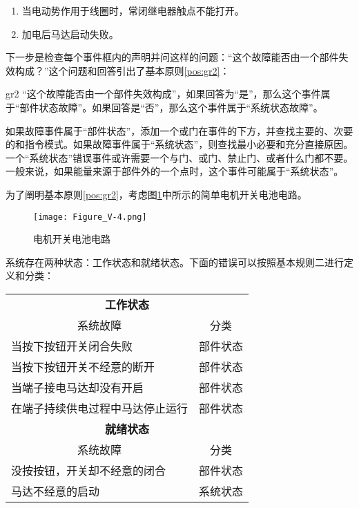 \documentclass[cn,11pt,chinese]{elegantbook}
\begin{document}
\begin{enumerate}
	\item 当电动势作用于线圈时，常闭继电器触点不能打开。
	\item 加电后马达启动失败。
\end{enumerate}


下一步是检查每个事件框内的声明并问这样的问题：“这个故障能否由一个部件失效构成？”这个问题和回答引出了基本原则\ref{pos:gr2}：

\begin{postulate}{}{gr2}
	“这个故障能否由一个部件失效构成”，如果回答为“是”，那么这个事件属于“部件状态故障”。如果回答是“否”，那么这个事件属于“系统状态故障”。
\end{postulate}

如果故障事件属于“部件状态”，添加一个或门在事件的下方，并查找主要的、次要的和指令模式。如果故障事件属于“系统状态”，则查找最小必要和充分直接原因。一个“系统状态”错误事件或许需要一个与门、或门、禁止门、或者什么门都不要。一般来说，如果能量来源于部件外的一个点时，这个事件可能属于“系统状态”。

为了阐明基本原则\ref{pos:gr2}，考虑图\ref{fig:fig5_4}中所示的简单电机开关电池电路。

\begin{figure}[h]
	\centering
	\texttt{[image: Figure\_V-4.png]}
	\caption{电机开关电池电路}\label{fig:fig5_4}
\end{figure}

系统存在两种状态：工作状态和就绪状态。下面的错误可以按照基本规则二进行定义和分类：


\begin{table}[H]
	\centering
	\begin{tabular}{@{}ll@{}}
		\multicolumn{2}{c}{\textbf{工作状态}}                 \\
		\multicolumn{1}{c}{系统故障} & \multicolumn{1}{c}{分类} \\
		当按下按钮开关闭合失败              & 部件状态                  \\
		当按下按钮开关不经意的断开            & 部件状态                   \\
		当端子接电马达却没有开启             & 部件状态                  \\
		在端子持续供电过程中马达停止运行         & 部件状态                   \\
		\multicolumn{2}{c}{\textbf{就绪状态}}                 \\
		\multicolumn{1}{c}{系统故障} & \multicolumn{1}{c}{分类} \\
		没按按钮，开关却不经意的闭合           & 部件状态                  \\
		马达不经意的启动                 & 系统状态                 
	\end{tabular}
\end{table}
 
\end{document}
